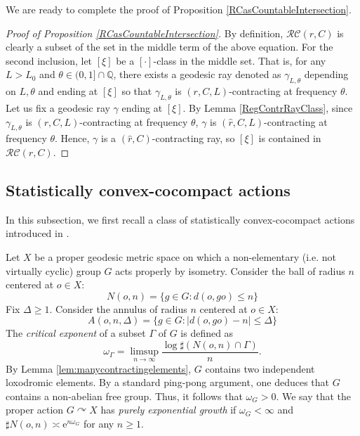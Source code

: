 \documentclass{amsart}
\theoremstyle{definition}
\theoremstyle{remark}
\newcommand{\act}{\curvearrowright}
\newcommand{\U}{ X}
\newcommand{\e}[1]{\omega_{#1}}
\begin{document}
We are ready to complete the proof of Proposition \ref{RCasCountableIntersection}.

\begin{proof}[Proof of Proposition \ref{RCasCountableIntersection}]
By definition, $\mathcal{RC}(r, C)$ is clearly a subset of the set in the middle term of the above equation.  For the second inclusion, let $[\xi]$ be a $[\cdot]$-class in the middle set. That is, for any $L>L_0 $ and $ \theta\in (0,1]\cap \mathbb Q$, there exists a geodesic ray denoted as $\gamma_{L,\theta}$ depending on $L,\theta$ and ending at $[\xi]$ so that $\gamma_{L,\theta}$ is $(r,C,L)$-contracting at frequency $\theta$. Let us fix a geodesic ray $\gamma$ ending at $[\xi]$. By Lemma \ref{RegContrRayClass}, since  $\gamma_{L,\theta}$ is $(r,C,L)$-contracting at frequency $\theta$,   $\gamma$ is $(\hat r,C,L)$-contracting at frequency $\theta$.  Hence, $\gamma$ is a $(\hat r,C)$-contracting ray, so $[\xi]$ is contained in $\mathcal{RC}(\hat r, C)$.
\end{proof}

\subsection{Statistically convex-cocompact actions}


In this subsection, we first recall a class of statistically convex-cocompact actions introduced in \cite{YANG10}. 

Let $X$ be a proper geodesic metric space on which a non-elementary (i.e. not virtually cyclic) group $G$  acts properly by isometry.
Consider the ball of radius $n$ centered at $o\in \U$: 
\begin{equation}\label{BallEQ}
N(o, n)=\{g\in G: d(o, go)\le n\}
\end{equation}    
Fix $\Delta\ge 1$. Consider the annulus of radius $n$ centered at $o\in \U$: 
\begin{equation}\label{AnnulusEQ}
A(o, n, \Delta)=\{g\in G: |d(o, go)-n|\le\Delta\}
\end{equation}
The \emph{critical exponent} of a subset $\Gamma$ of $G$ is defined as
\[
\e \Gamma =\limsup_{n \to \infty} \frac{ \log {\sharp (N(o, n) \cap \Gamma)}}{n}.
\]
By Lemma \ref{lem:manycontractingelements}, $G$ contains two independent loxodromic elements. By a standard ping-pong argument, one deduces that $G$ contains a non-abelian free group. Thus, it follows that $\e G>0$.
We say that the proper action $G\act X$ has \textit{purely exponential growth} if $\e G<\infty$ and $\sharp N(o,n)\asymp \mathrm{e}^{n\e G}$ for any $n\ge 1$.
\end{document}
